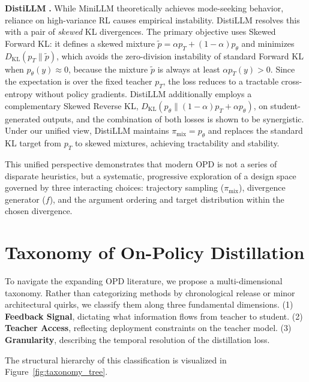 \documentclass{article} %
\newcommand{\KL}{D_{\mathrm{KL}}}
\newcommand{\ptheta}{p_\theta}
\newcommand{\pteacher}{p_T}
\begin{document}
\textbf{DistiLLM} \citep{2402.03898}\textbf{.} While MiniLLM theoretically achieves mode-seeking behavior, reliance on high-variance RL causes empirical instability. DistiLLM resolves this with a pair of \emph{skewed} KL divergences. The primary objective uses Skewed Forward KL: it defines a skewed mixture $\tilde{p} = \alpha \pteacher + (1-\alpha) \ptheta$ and minimizes $\KL(\pteacher \parallel \tilde{p})$, which avoids the zero-division instability of standard Forward KL when $\ptheta(y) \approx 0$, because the mixture $\tilde{p}$ is always at least $\alpha \pteacher(y) > 0$. Since the expectation is over the fixed teacher $\pteacher$, the loss reduces to a tractable cross-entropy without policy gradients. DistiLLM additionally employs a complementary Skewed Reverse KL, $\KL(\ptheta \parallel (1-\alpha)\pteacher + \alpha\ptheta)$, on student-generated outputs, and the combination of both losses is shown to be synergistic. Under our unified view, DistiLLM maintains $\pi_{\mathrm{mix}} = \ptheta$ and replaces the standard KL target from $\pteacher$ to skewed mixtures, achieving tractability and stability.

This unified perspective demonstrates that modern OPD is not a series of disparate heuristics, but a systematic, progressive exploration of a design space governed by three interacting choices: trajectory sampling ($\pi_{\text{mix}}$), divergence generator ($f$), and the argument ordering and target distribution within the chosen divergence.


\section{Taxonomy of On-Policy Distillation}
\label{sec:taxonomy}

To navigate the expanding OPD literature, we propose a multi-dimensional taxonomy. Rather than categorizing methods by chronological release or minor architectural quirks, we classify them along three fundamental dimensions. (1) \textbf{Feedback Signal}, dictating what information flows from teacher to student. (2) \textbf{Teacher Access}, reflecting deployment constraints on the teacher model. (3) \textbf{Granularity}, describing the temporal resolution of the distillation loss.

The structural hierarchy of this classification is visualized in Figure~\ref{fig:taxonomy_tree}.
\end{document}
